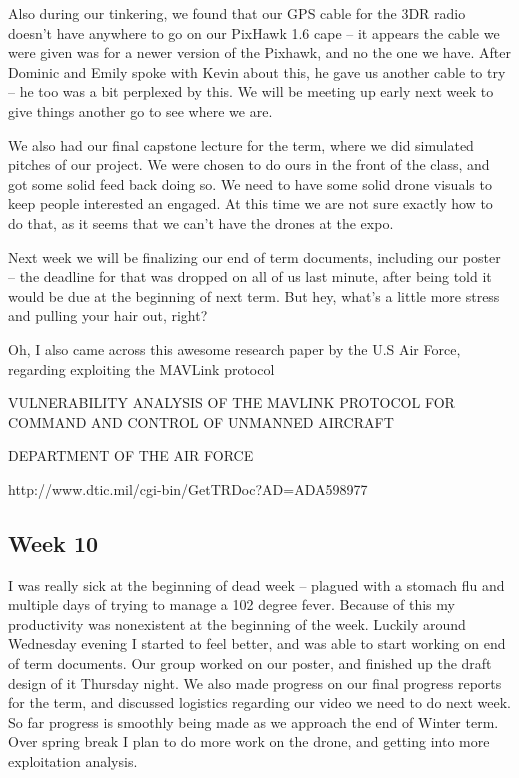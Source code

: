 \documentclass[IEEEtran,letterpaper,10pt,notitlepage,draftclsnofoot,onecolumn]{article}
\begin{document}
  Also during our tinkering, we found that our GPS cable for the 3DR radio doesn't have anywhere to go on our PixHawk 1.6 cape -- it appears the cable we were given was for a newer version of the Pixhawk, and no the one we have. After Dominic and Emily spoke with Kevin about this, he gave us another cable to try -- he too was a bit perplexed by this. We will be meeting up early next week to give things another go to see where we are.

  We also had our final capstone lecture for the term, where we did simulated pitches of our project. We were chosen to do ours in the front of the class, and got some solid feed back doing so. We need to have some solid drone visuals to keep people interested an engaged. At this time we are not sure exactly how to do that, as it seems that we can't have the drones at the expo.

  Next week we will be finalizing our end of term documents, including our poster -- the deadline for that was dropped on all of us last minute, after being told it would be due at the beginning of next term. But hey, what's a little more stress and pulling your hair out, right?

  Oh, I also came across this awesome research paper by the U.S Air Force, regarding exploiting the MAVLink protocol

  VULNERABILITY ANALYSIS OF THE MAVLINK PROTOCOL FOR COMMAND AND CONTROL OF UNMANNED AIRCRAFT

  DEPARTMENT OF THE AIR FORCE

  http://www.dtic.mil/cgi-bin/GetTRDoc?AD=ADA598977

  \subsection{Week 10}
  I was really sick at the beginning of dead week -- plagued with a stomach flu and multiple days of trying to manage a 102 degree fever. Because of this my productivity was nonexistent at the beginning of the week. Luckily around Wednesday evening I started to feel better, and was able to start working on end of term documents. Our group worked on our poster, and finished up the draft design of it Thursday night. We also made progress on our final progress reports for the term, and discussed logistics regarding our video we need to do next week. So far progress is smoothly being made as we approach the end of Winter term. Over spring break I plan to do more work on the drone, and getting into more exploitation analysis.
\end{document}
